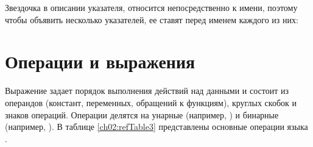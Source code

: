 



Звездочка в описании указателя, относится непосредственно к имени, поэтому чтобы объявить несколько
указателей, ее ставят перед именем каждого из них: 




\section[Операции и выражения]{Операции и выражения}
Выражение задает порядок выполнения действий над данными и состоит из
операндов (констант, переменных, обращений к функциям), круглых скобок и знаков
операций. Операции делятся на унарные
(например, ) и бинарные
(например,  ). В таблице \ref{ch02:refTable3} представлены основные операции языка .


